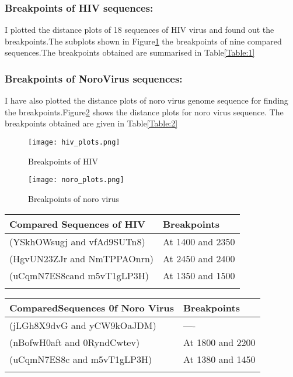 \documentclass{article}
\begin{document}
\subsubsection{Breakpoints of HIV sequences:}
I plotted the distance plots of 18 sequences of HIV virus and found out the breakpoints.The subplots shown in Figure\ref{Figure:2} the breakpoints of nine compared sequences.The breakpoints obtained are summarised in Table\ref{Table:1}

\subsubsection{Breakpoints of NoroVirus sequences:}
I have also plotted the distance plots of noro virus genome sequence for finding the breakpoints.Figure\ref{Figure:3} shows the distance plots for noro virus sequence. The breakpoints obtained are given in Table\ref{Table:2}

\begin{figure}
    \centering
    \texttt{[image: hiv\_plots.png]}
    \caption{Breakpoints of HIV}
    \label{Figure:2}
\end{figure}

\begin{figure}
    \centering
    \texttt{[image: noro\_plots.png]}
    \caption{Breakpoints of noro virus}
    \label{Figure:3}
\end{figure}

\begin{tabular}{ |p{3cm}||p{3cm}}
 \hline
 Compared Sequences of HIV& Breakpoints \\
 \hline
 (YSkhOWsugj and vfAd9SUTn8)  & At 1400 and 2350   \\
 (HgvUN23ZJr and NmTPPAOnrn)& At 2450 and 2400 \\
(uCqmN7ES8cand m5vT1gLP3H)  &At 1350 and 1500 \\
 \hline
 \label{Table:1}
\end{tabular}


\begin{tabular}{ |p{3cm}||p{3cm}}
 \hline
 ComparedSequences 0f Noro Virus & Breakpoints \\
 \hline
 (jLGh8X9dvG and yCW9kOaJDM)  & ----   \\
 (nBofwH0aft and 0RyndCwtev)& At 1800 and 2200 \\
(uCqmN7ES8c and m5vT1gLP3H)  &At 1380 and 1450 \\
 \hline
 \label{Table:2}
\end{tabular}
\end{document}
